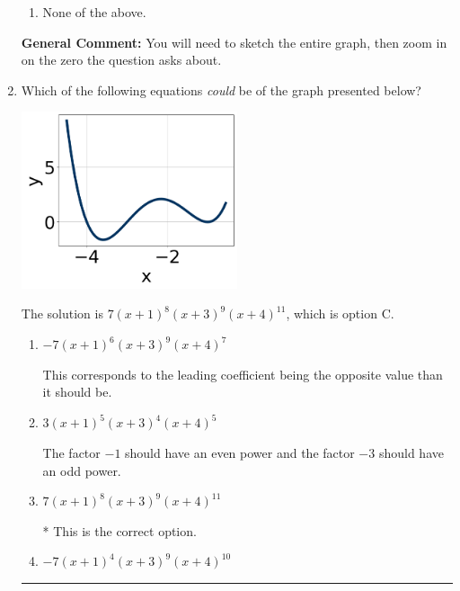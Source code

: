 \documentclass{extbook}[14pt]
\newcommand{\litem}[1]{\item #1

\rule{\textwidth}{0.4pt}}
\begin{document}
\begin{enumerate}
{\begin{enumerate}[label=\Alph*.]
\item None of the above.\end{enumerate}
\textbf{General Comment:} You will need to sketch the entire graph, then zoom in on the zero the question asks about.
}
\litem{
Which of the following equations \textit{could} be of the graph presented below?

\begin{center}
    \includegraphics[width=0.5\textwidth]{../Figures/polyGraphToFunctionA.png}
\end{center}


The solution is \( 7(x + 1)^{8} (x + 3)^{9} (x + 4)^{11} \), which is option C.\begin{enumerate}[label=\Alph*.]
\item \( -7(x + 1)^{6} (x + 3)^{9} (x + 4)^{7} \)

This corresponds to the leading coefficient being the opposite value than it should be.
\item \( 3(x + 1)^{5} (x + 3)^{4} (x + 4)^{5} \)

The factor $-1$ should have an even power and the factor $-3$ should have an odd power.
\item \( 7(x + 1)^{8} (x + 3)^{9} (x + 4)^{11} \)

* This is the correct option.
\item \( -7(x + 1)^{4} (x + 3)^{9} (x + 4)^{10} \)


\end{enumerate}}
\end{enumerate}
\end{document}
